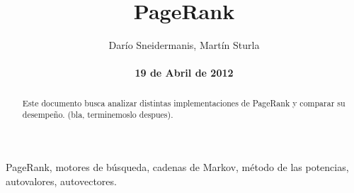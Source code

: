 \documentclass[%
    final,
    reprint,
    notitlepage,
    narroweqnarray,
    inline,
    twoside,
    invited
    ]{ieee}
\begin{document}
\title[PageRank]{%
       PageRank}

\author[Sneidermanis, Sturla]{Darío Sneidermanis, Martín Sturla\\
\\\textbf{19 de Abril de 2012}
}



\lognumber{}
\pubitemident{}


\maketitle               

\begin{abstract} 
Este documento busca analizar distintas implementaciones de PageRank y comparar su desempeño. (bla, terminemoslo despues).
\end{abstract}

\begin{keywords}
PageRank, motores de búsqueda, cadenas de Markov, método de las potencias, autovalores, autovectores.
\end{keywords}

\end{document}
